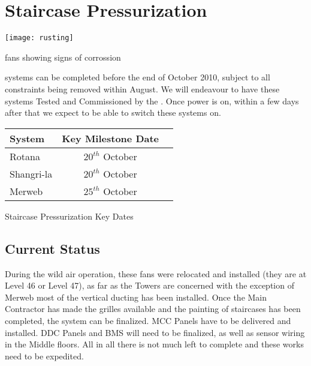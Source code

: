 
\chapter{Staircase Pressurization}



\begin{marginfigure}
  \texttt{[image: rusting]}
  \caption{fans showing signs of corrossion}
  \label{fig:rusting}
\end{marginfigure}

 systems can be completed before the end of October 2010, subject to all constraints being removed within August. We will endeavour to have these systems Tested and Commissioned by the \deadline. Once power is on, within a few days after that we expect to be able to switch these systems on.

           \begin{margintable} 
	    \begin{tabular}{lcl}
	      \toprule
	      System    & Key Milestone Date  \\
	      \midrule
                 Rotana      & $20^{th}$  October  \\   
                 Shangri-la  & $20^{th}$ October\\
	     Merweb     &  $25^{th}$  October  \\
     	      \bottomrule
	    \end{tabular}
           \caption{Staircase Pressurization Key Dates}
           \label{tbl:KEkeydates}
            \end{margintable}

\section{Current Status}

During the wild air operation, these fans were relocated and installed (they are at Level 46 or Level 47), as far as the Towers are concerned with the exception of Merweb most of the vertical ducting has been installed. Once the Main Contractor has made the grilles available and the painting of staircases has been completed, the system can be finalized. MCC Panels have to be delivered and installed. DDC Panels and BMS will need to be finalized, as well as sensor wiring in the Middle floors. All in all there is not much left to complete and these works need to be expedited.

